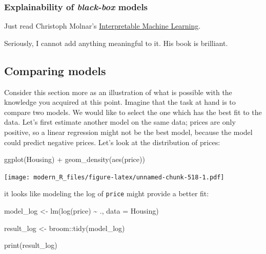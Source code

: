 \documentclass[
]{article}
\newenvironment{Shaded}{\begin{snugshade}}{\end{snugshade}}
\newcommand{\AttributeTok}[1]{\textcolor[rgb]{0.77,0.63,0.00}{#1}}
\newcommand{\FunctionTok}[1]{\textcolor[rgb]{0.00,0.00,0.00}{#1}}
\newcommand{\NormalTok}[1]{#1}
\newcommand{\OtherTok}[1]{\textcolor[rgb]{0.56,0.35,0.01}{#1}}
\newcommand{\SpecialCharTok}[1]{\textcolor[rgb]{0.00,0.00,0.00}{#1}}
\begin{document}
\hypertarget{explainability-of-black-box-models}{%
\subsubsection{\texorpdfstring{Explainability of \emph{black-box} models}{Explainability of black-box models}}\label{explainability-of-black-box-models}}

Just read Christoph Molnar's
\href{https://christophm.github.io/interpretable-ml-book/}{Interpretable Machine Learning}.

Seriously, I cannot add anything meaningful to it. His book is brilliant.

\hypertarget{comparing-models}{%
\subsection{Comparing models}\label{comparing-models}}

Consider this section more as an illustration of what is possible with the knowledge you acquired
at this point. Imagine that the task at hand is to compare two models. We would like to select
the one which has the best fit to the data.
Let's first estimate another model on the same data; prices are only positive, so a linear regression
might not be the best model, because the model could predict negative prices. Let's look at the
distribution of prices:

\begin{Shaded}
\begin{Highlighting}[]
\FunctionTok{ggplot}\NormalTok{(Housing) }\SpecialCharTok{+}
  \FunctionTok{geom\_density}\NormalTok{(}\FunctionTok{aes}\NormalTok{(price))}
\end{Highlighting}
\end{Shaded}

\texttt{[image: modern\_R\_files/figure-latex/unnamed-chunk-518-1.pdf]}

it looks like modeling the log of \texttt{price} might provide a better fit:

\begin{Shaded}
\begin{Highlighting}[]
\NormalTok{model\_log }\OtherTok{\textless{}{-}} \FunctionTok{lm}\NormalTok{(}\FunctionTok{log}\NormalTok{(price) }\SpecialCharTok{\textasciitilde{}}\NormalTok{ ., }\AttributeTok{data =}\NormalTok{ Housing)}

\NormalTok{result\_log }\OtherTok{\textless{}{-}}\NormalTok{ broom}\SpecialCharTok{::}\FunctionTok{tidy}\NormalTok{(model\_log)}

\FunctionTok{print}\NormalTok{(result\_log)}
\end{Highlighting}
\end{Shaded}
\end{document}
